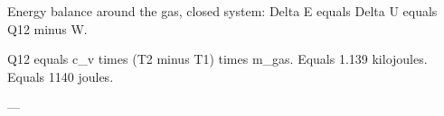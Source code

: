 Energy balance around the gas, closed system:  
Delta E equals Delta U equals Q12 minus W.  

Q12 equals c_v times (T2 minus T1) times m_gas.  
Equals 1.139 kilojoules.  
Equals 1140 joules.  

---